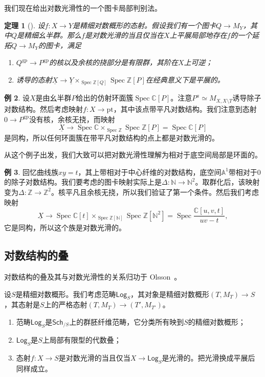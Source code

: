 \documentclass{amsart}
\newtheorem{thm}{定理}[section]
\theoremstyle{definition}
\newtheorem{exm}[thm]{例}
\theoremstyle{remark}
\theoremstyle{plain}
\theoremstyle{definition}
\theoremstyle{remark}
\newcommand{\A}{\mathbb{A}}
\newcommand{\N}{\mathbb{N}}
\newcommand{\C}{\mathbb{C}}
\newcommand{\Z}{\mathbb{Z}}
\newcommand{\mr}[1]{\mathrm{#1}}
\newcommand{\ms}[1]{\mathsf{#1}}
\newcommand{\ul}[1]{\underline{#1}}
\newcommand{\1}{\mathbf{1}}
\newcommand{\2}{\mathbf{2}}
\newcommand{\3}{\mathbf{3}}
\DeclareMathOperator{\Spec}{Spec}
\begin{document}
我们现在给出对数光滑性的一个图卡局部判别法。

\begin{thm}[{\cite[定理~3.5]{Kato1989}}]
    设\(f \colon X \to Y\)是精细对数概形的态射。假设我们有一个图卡\(Q \to M_Y\)，其中\(Q\)是精细幺半群。那么\(f\)是对数光滑的当且仅当在\(X\)上平展局部地存在\(f\)的一个延拓\(Q \to M_Y\)的图卡，满足
    \begin{enumerate}
        \item \(Q^{\mr{gp}} \to P^{\mr{gp}}\)的核以及余核的挠部分是有限群，其阶在\(X\)上可逆；
        \item 诱导的态射\(\ul{X} \to \ul{Y} \times_{\Spec \Z[Q]} \Spec \Z[P]\)在经典意义下是平展的。
    \end{enumerate}
\end{thm}

\begin{exm}
    设\(X\)是由幺半群\(P\)给出的仿射环面簇\(\Spec \C[P]\)。注意\(P^a \simeq M_{X, X \setminus T}\)诱导除子对数结构。然后考虑映射\(f \colon X \to \mr{pt}\)，其中该点带平凡对数结构。我们注意到态射\(0 \to P^{\mr{gp}}\)没有核，余核无挠，而映射
    \[ \ul{X} \to \Spec \C \times_{\Spec \Z} \Spec \Z[P] = \Spec \C[P] \]
    是同构，所以任何环面簇在带平凡对数结构的点上都是对数光滑的。
\end{exm}

从这个例子出发，我们大致可以把对数光滑性理解为相对于底空间局部是环面的。

\begin{exm}
    回忆曲线族\(xy = t\)，其上带相对于中心纤维的对数结构，底空间\(\A^1\)带相对于\(0\)的除子对数结构。我们要考虑的图卡映射实际上是\(\Delta \colon \N \to \N^2\)。取群化后，该映射变为\(\Delta \colon \Z \to \Z^2\)。核平凡且余核无挠，所以我们验证了第一个条件。然后我们考虑映射
    \[ \ul{X} \to \Spec \C[t] \times_{\Spec \Z[\N]} \Spec \Z[\N^2] = \Spec \frac{\C[u,v,t]}{uv-t}, \]
    它是同构，所以这个族是对数光滑的。
\end{exm}

\subsection{对数结构的叠}%
\label{sub:Stack of log structures}

对数结构的叠及其与对数光滑性的关系归功于 Olsson~\cite{Olsson2003}。

设\(S\)是精细对数概形。我们考虑范畴\(\ms{Log}_S\)，其对象是精细对数概形\((T, M_T) \to S\)，其态射是\(S\)上的严格态射\((T, M_T) \to (T', M_{T'})\)。
\begin{enumerate}
    \item 范畴\(\ms{Log}_S\)是\(\ms{Sch}_{/S}\)上的群胚纤维范畴，它分类所有映到\(S\)的精细对数概形；
    \item \(\ms{Log}_S\)是\(S\)上局部有限型的代数叠；
    \item 态射\(f \colon X \to S\)是对数光滑的当且仅当\(X \to \ms{Log}_S\)是光滑的。把光滑换成平展后同样成立。
\end{enumerate}
\end{document}

